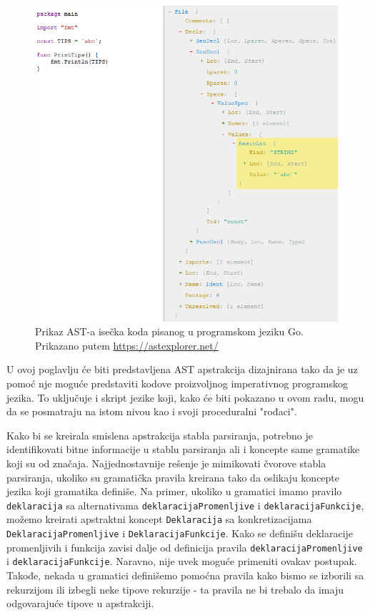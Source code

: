 \begin{figure}[h!]
    \centering
        \includegraphics[scale=0.7]{images/ast_go.png}
    \caption{Prikaz AST-a isečka koda pisanog u programskom jeziku Go. Prikazano putem \url{https://astexplorer.net/}}
    \label{fig:ASTGo}
\end{figure}

U ovoj poglavlju će biti predstavljena AST apstrakcija dizajnirana tako da je uz pomoć nje moguće predstaviti kodove proizvoljnog imperativnog programskog jezika. To uključuje i skript jezike koji, kako će biti pokazano u ovom radu, mogu da se posmatraju na istom nivou kao i svoji proceduralni "rođaci".

Kako bi se kreirala smislena apstrakcija stabla parsiranja, potrebno je identifikovati bitne informacije u stablu parsiranja ali i koncepte same gramatike koji su od značaja. Najjednostavnije rešenje je mimikovati čvorove stabla parsiranja, ukoliko su gramatička pravila kreirana tako da oslikaju koncepte jezika koji gramatika definiše. Na primer, ukoliko u gramatici imamo pravilo \texttt{deklaracija} sa alternativama \texttt{deklaracijaPromenljive} i \texttt{deklaracijaFunkcije}, možemo kreirati apstraktni koncept \texttt{Deklaracija} sa konkretizacijama \texttt{DeklaracijaPromenljive} i \texttt{DeklaracijaFunkcije}. Kako se definišu deklaracije promenljivih i funkcija zavisi dalje od definicija pravila \texttt{deklaracijaPromenljive} i \texttt{deklaracijaFunkcije}. Naravno, nije uvek moguće primeniti ovakav postupak. Takođe, nekada u gramatici definišemo pomoćna pravila kako bismo se izborili sa rekurzijom ili izbegli neke tipove rekurzije - ta pravila ne bi trebalo da imaju odgovarajuće tipove u apstrakciji. 

